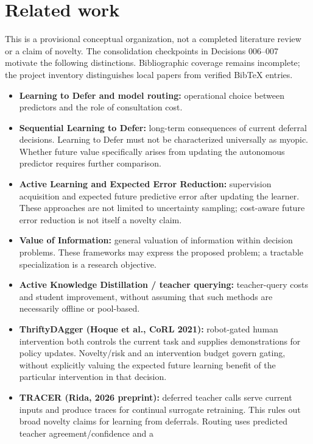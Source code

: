 \section{Related work}

This is a provisional conceptual organization, not a completed literature
review or a claim of novelty. The consolidation checkpoints in Decisions 006--007 motivate the following
distinctions. Bibliographic coverage remains incomplete; the project
inventory distinguishes local papers from verified BibTeX entries.

\begin{itemize}
  \item \textbf{Learning to Defer and model routing:} operational choice
    between predictors and the role of consultation cost.
  \item \textbf{Sequential Learning to Defer:} long-term consequences of
    current deferral decisions. Learning to Defer must not be characterized
    universally as myopic. Whether future value specifically arises from
    updating the autonomous predictor requires further comparison.
  \item \textbf{Active Learning and Expected Error Reduction:} supervision
    acquisition and expected future predictive error after updating the
    learner. These approaches are not limited to uncertainty sampling;
    cost-aware future error reduction is not itself a novelty claim.
  \item \textbf{Value of Information:} general valuation of information
    within decision problems. These frameworks may express the proposed
    problem; a tractable specialization is a research objective.
  \item \textbf{Active Knowledge Distillation / teacher querying:}
    teacher-query costs and student improvement, without assuming that
    such methods are necessarily offline or pool-based.
  \item \textbf{ThriftyDAgger (Hoque et al., CoRL 2021):} robot-gated
    human intervention both controls the current task and supplies
    demonstrations for policy updates. Novelty/risk and an intervention
    budget govern gating, without explicitly valuing the expected future
    learning benefit of the particular intervention in that decision.
  \item \textbf{TRACER (Rida, 2026 preprint):} deferred teacher calls
    serve current inputs and produce traces for continual surrogate
    retraining. This rules out broad novelty claims for learning from
    deferrals. Routing uses predicted teacher agreement/confidence and a

\end{itemize}
